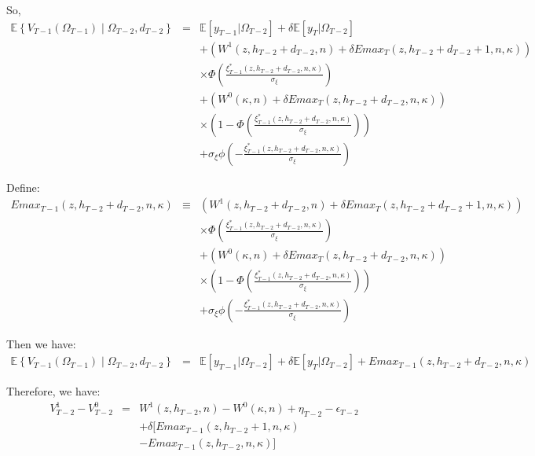 \noindent So,
\begin{eqnarray*}
\mathbb{E} \left\{ V_{T-1}\left(\Omega_{T-1}\right) \middle| \Omega_{T-2}, d_{T-2}\right\} &=& \mathbb{E} [y_{T-1} | \Omega_{T-2}] + \delta \mathbb{E} [y_T | \Omega_{T-2}] \\
& & + \left( W^1 \left( z, h_{T-2}+ d_{T-2}, n \right) + \delta Emax_T \left( z, h_{T-2} + d_{T-2} +1, n, \kappa \right) \right) \\
& & \times \Phi \left(\frac{\xi^*_{T-1}\left(z, h_{T-2}+d_{T-2}, n, \kappa \right)}{\sigma_\xi}\right) \\
& & + \left( W^0\left(\kappa, n \right) + \delta Emax_T \left( z, h_{T-2}+d_{T-2}, n, \kappa \right) \right) \\
& & \times \left( 1 - \Phi \left(\frac{\xi^*_{T-1}\left(z, h_{T-2}+d_{T-2}, n, \kappa \right)}{\sigma_\xi}\right) \right) \\
& & + \sigma_\xi \phi \left(-\frac{\xi^*_{T-1}\left(z, h_{T-2}+d_{T-2}, n, \kappa \right)}{\sigma_\xi}\right)
\end{eqnarray*} 

\noindent Define:
\begin{eqnarray*}
Emax_{T-1} \left( z, h_{T-2}+d_{T-2}, n, \kappa \right) & \equiv & \left( W^1 \left( z, h_{T-2}+ d_{T-2}, n \right) + \delta Emax_T \left( z, h_{T-2} + d_{T-2} +1, n, \kappa \right) \right) \\
& & \times \Phi \left(\frac{\xi^*_{T-1}\left(z, h_{T-2}+d_{T-2}, n, \kappa \right)}{\sigma_\xi}\right) \\
& & + \left( W^0\left(\kappa, n \right) + \delta Emax_T \left( z, h_{T-2}+d_{T-2}, n, \kappa \right) \right) \\
& & \times \left( 1 - \Phi \left(\frac{\xi^*_{T-1}\left(z, h_{T-2}+d_{T-2}, n, \kappa \right)}{\sigma_\xi}\right) \right) \\
& & + \sigma_\xi \phi \left(-\frac{\xi^*_{T-1}\left(z, h_{T-2}+d_{T-2}, n, \kappa \right)}{\sigma_\xi}\right)
\end{eqnarray*}

\noindent Then we have:
\begin{eqnarray*}
\mathbb{E} \left\{ V_{T-1}\left(\Omega_{T-1}\right) \middle| \Omega_{T-2}, d_{T-2}\right\} &=& \mathbb{E} [y_{T-1} | \Omega_{T-2}] + \delta \mathbb{E} [y_T | \Omega_{T-2}] + Emax_{T-1} \left( z, h_{T-2}+d_{T-2}, n, \kappa \right)
\end{eqnarray*}

\noindent Therefore, we have:
\begin{eqnarray*}
V^1_{T-2} - V^0_{T-2} &=& W^1\left( z, h_{T-2}, n\right) - W^0\left( \kappa, n\right) + \eta_{T-2} - \epsilon_{T-2}\\
& & + \delta [ Emax_{T-1} \left( z, h_{T-2}+1, n, \kappa \right) \\
& & - Emax_{T-1} \left(z, h_{T-2}, n, \kappa \right)]
\end{eqnarray*}

